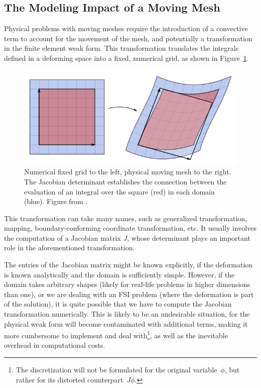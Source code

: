 \documentclass[thesis.tex]{subfiles}
\begin{document}
\subsection{The Modeling Impact of a Moving Mesh}
Physical problems with moving meshes require 
the introduction of a convective term to account for 
the movement of the mesh, 
and potentially a transformation in the finite element weak form.
This transformation translates the integrals 
defined in a deforming space into a fixed, 
numerical grid, 
as shown in Figure~\ref{fig:jacobianTransformation}.
\begin{figure}[h]
    \includegraphics[width=\columnwidth]{research_project/piston/figures/Jacobian_determinant_and_distortion.png}
    \caption{Numerical fixed grid to the left, physical moving mesh to the right.
    The Jacobian determinant establishes the connection between 
    the evaluation of an integral over the square (red) in each domain (blue).
    Figure from \cite{jacobianTransformation}.}
    \label{fig:jacobianTransformation}
\end{figure}

This transformation can take many names, 
such as generalized transformation, 
mapping,
boundary-conforming coordinate transformation,
etc.
It usually involves the computation of a Jacobian matrix $J$,
whose determinant plays an important role in the aforementioned transformation.

The entries of the Jacobian matrix might be known explicitly,
if the deformation is known analytically and the domain is sufficiently simple.
However, if the domain takes arbitrary shapes 
(likely for real-life problems in higher dimensions than one),
or we are dealing with an FSI problem (where the deformation is part of the solution),
it is quite possible that we have to compute the Jacobian transformation numerically.
This is likely to be an undesirable situation, 
for the physical weak form will become contaminated with additional terms, 
making it more cumbersome to implement and deal with\footnote{
    The discretization will not be formulated for the original variable~$\phi$,
    but rather for its distorted counterpart~$J \phi$.
    },
as well as the inevitable overhead in computational costs.
\end{document}
